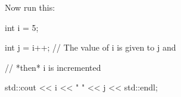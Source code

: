  Now run this:

\begin{console}

int i = 5;

int j = i++; // The value of i is given to j and

             // *then* i is incremented

std::cout << i << " " << j << std::endl;

\end{console}

